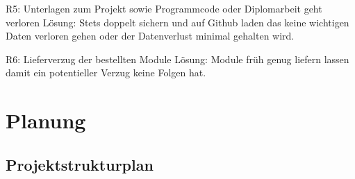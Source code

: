 	R5: Unterlagen zum Projekt sowie Programmcode oder Diplomarbeit geht verloren \newline
	Lösung: Stets doppelt sichern und auf Github laden das keine wichtigen Daten verloren gehen oder der Datenverlust minimal gehalten wird. 
	 
    R6: Lieferverzug der bestellten Module \newline
	Lösung: Module früh genug liefern lassen damit ein potentieller Verzug keine Folgen hat.  

	

\newpage
\section{Planung}
\subsection{Projektstrukturplan}
\def \currentAuthor{Florian Tipotsch}
\newpage
